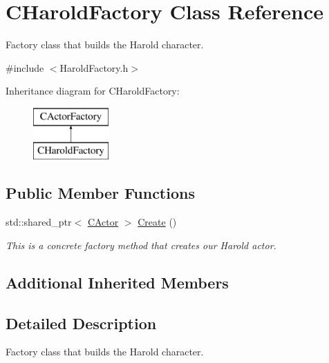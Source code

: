 \hypertarget{class_c_harold_factory}{\section{C\+Harold\+Factory Class Reference}
\label{class_c_harold_factory}
}


Factory class that builds the Harold character.  




{\ttfamily \#include $<$Harold\+Factory.\+h$>$}

Inheritance diagram for C\+Harold\+Factory\+:\begin{figure}[H]
\begin{center}
\leavevmode
\includegraphics[height=2.000000cm]{class_c_harold_factory}
\end{center}
\end{figure}
\subsection*{Public Member Functions}
\begin{DoxyCompactItemize}
\item 
std\+::shared\+\_\+ptr$<$ \hyperlink{class_c_actor}{C\+Actor} $>$ \hyperlink{class_c_harold_factory_a785f8194f83d866bfc2a237fc3d4abc1}{Create} ()
\begin{DoxyCompactList}\small\item\em This is a concrete factory method that creates our Harold actor. \end{DoxyCompactList}\end{DoxyCompactItemize}
\subsection*{Additional Inherited Members}


\subsection{Detailed Description}
Factory class that builds the Harold character. 

